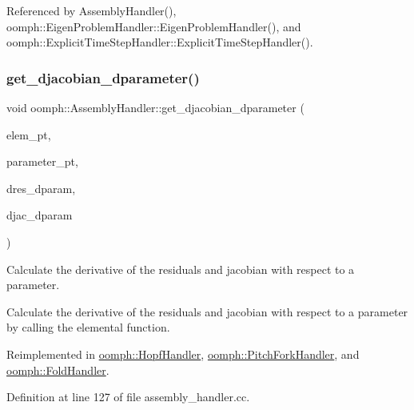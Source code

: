 Referenced by Assembly\+Handler(), oomph\+::\+Eigen\+Problem\+Handler\+::\+Eigen\+Problem\+Handler(), and oomph\+::\+Explicit\+Time\+Step\+Handler\+::\+Explicit\+Time\+Step\+Handler().

\mbox{\label{classoomph_1_1AssemblyHandler_aefc0c13a65342806c167c5d53f014803}} 
\subsubsection{\texorpdfstring{get\+\_\+djacobian\+\_\+dparameter()}{get\_djacobian\_dparameter()}}
{\footnotesize\ttfamily void oomph\+::\+Assembly\+Handler\+::get\+\_\+djacobian\+\_\+dparameter (\begin{DoxyParamCaption}\item[{\hyperlink{classoomph_1_1GeneralisedElement}{Generalised\+Element} $\ast$const \&}]{elem\+\_\+pt,  }\item[{double $\ast$const \&}]{parameter\+\_\+pt,  }\item[{\hyperlink{classoomph_1_1Vector}{Vector}$<$ double $>$ \&}]{dres\+\_\+dparam,  }\item[{\hyperlink{classoomph_1_1DenseMatrix}{Dense\+Matrix}$<$ double $>$ \&}]{djac\+\_\+dparam }\end{DoxyParamCaption})\hspace{0.3cm}{\ttfamily [virtual]}}



Calculate the derivative of the residuals and jacobian with respect to a parameter. 

Calculate the derivative of the residuals and jacobian with respect to a parameter by calling the elemental function. 

Reimplemented in \hyperlink{classoomph_1_1HopfHandler_a59fb2c41d850cfe1fdccc3e97ca75135}{oomph\+::\+Hopf\+Handler}, \hyperlink{classoomph_1_1PitchForkHandler_aa16d6770f6d46b7db4101f417373b191}{oomph\+::\+Pitch\+Fork\+Handler}, and \hyperlink{classoomph_1_1FoldHandler_a674cf9fe7c065e54c95813c2baeea84c}{oomph\+::\+Fold\+Handler}.



Definition at line 127 of file assembly\+\_\+handler.\+cc.



